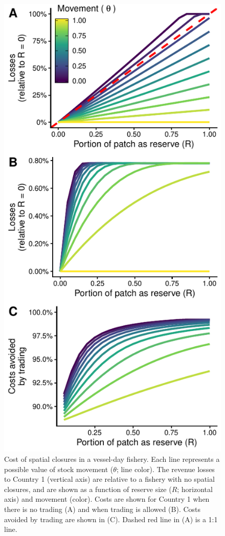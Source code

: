 \documentclass[12pt]{article}
\begin{document}
\begin{figure}[htbp]
\centering
\includegraphics{img/PNA_model.pdf}
\caption{\label{fig:PNA_model}Cost of spatial closures in a vessel-day fishery. Each line represents a possible value of stock movement ($\theta$; line color). The revenue losses to Country 1 (vertical axis) are relative to a fishery with no spatial closures, and are shown as a function of reserve size ($R$; horizontal axis) and movement (color). Costs are shown for Country 1 when there is no trading (A) and when trading is allowed (B). Costs avoided by trading are shown in (C). Dashed red line in (A) is a 1:1 line.}
\end{figure}
\end{document}
